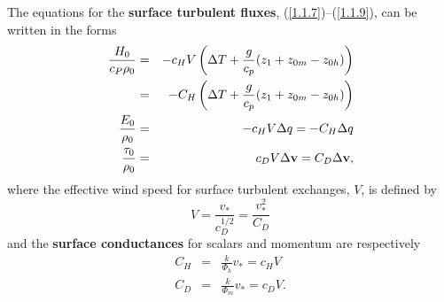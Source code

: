 \documentclass{UMDP_article}
\begin{document}
The equations for the \textbf{surface turbulent fluxes},
(\ref{1.1.7})--(\ref{1.1.9}), can be written in the forms
\begin{eqnarray}
  \frac{ H_0 }{ c_P  \rho _0 }&=&{-c}_H V \left( {\Delta T + \frac{g}{c_p }( z_1 +  z_{0m} -  z_{0h} )} \right)\nonumber\\
  &=& - C_H \left( {\Delta T + \frac{g}{c_p } ( z_1 +  z_{0m} -  z_{0h} )} \right)\label{1.1.16}\\
  \frac{ E_0 }{ \rho _0 }&=&- c_H V \Delta q = - C_H \Delta q\label{1.1.17}\\
  \frac{ {\rm {\bf \tau }}_{0} }{ \rho _{0} }&=& c_D V \Delta {\rm {\bf v}}{ }=  C_D \Delta {\rm {\bf v}},\label{1.1.18}
\end{eqnarray}
where the effective wind speed for surface turbulent exchanges, $V$,
is defined by
\begin{equation}
  V = \frac{ v_\ast }{ c_D^{1/2} } = \frac{ v_\ast ^2 }{ C_D }\label{1.1.19}
\end{equation}
and the \textbf{surface conductances} for scalars and momentum are
respectively
\begin{eqnarray}
  C_H&=&\frac{k}{ \Phi _h }  v_\ast =  c_H V\label{1.1.20}\\
  C_D&=&\frac{k}{ \Phi _m }  v_\ast =  c_D V\label{1.1.21}.
\end{eqnarray}
\end{document}
